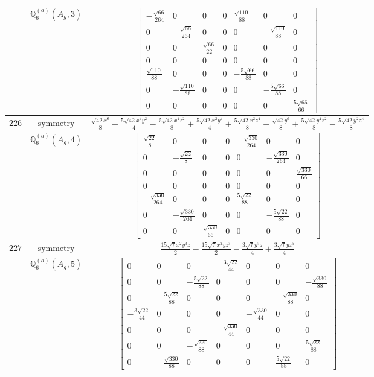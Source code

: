 \documentclass[fleqn,8pt,landscape]{jsarticle}
\begin{document}
\begin{longtable}{ccc}
$  $ & $ \mathbb{Q}_{6}^{(a)}(A_{g},3) $ & $ \begin{bmatrix} - \frac{\sqrt{66}}{264} & 0 & 0 & 0 & \frac{\sqrt{110}}{88} & 0 & 0 \\ 0 & - \frac{\sqrt{66}}{264} & 0 & 0 & 0 & - \frac{\sqrt{110}}{88} & 0 \\ 0 & 0 & \frac{\sqrt{66}}{22} & 0 & 0 & 0 & 0 \\ 0 & 0 & 0 & 0 & 0 & 0 & 0 \\ \frac{\sqrt{110}}{88} & 0 & 0 & 0 & - \frac{5 \sqrt{66}}{88} & 0 & 0 \\ 0 & - \frac{\sqrt{110}}{88} & 0 & 0 & 0 & - \frac{5 \sqrt{66}}{88} & 0 \\ 0 & 0 & 0 & 0 & 0 & 0 & \frac{5 \sqrt{66}}{66} \end{bmatrix} $ \\ \hline
$ 226 $ & $ \text{symmetry} $ & $ \frac{\sqrt{42} x^{6}}{8} - \frac{5 \sqrt{42} x^{4} y^{2}}{4} - \frac{5 \sqrt{42} x^{4} z^{2}}{8} + \frac{5 \sqrt{42} x^{2} y^{4}}{4} + \frac{5 \sqrt{42} x^{2} z^{4}}{8} - \frac{\sqrt{42} y^{6}}{8} + \frac{5 \sqrt{42} y^{4} z^{2}}{8} - \frac{5 \sqrt{42} y^{2} z^{4}}{8} $ \\
$  $ & $ \mathbb{Q}_{6}^{(a)}(A_{g},4) $ & $ \begin{bmatrix} \frac{\sqrt{22}}{8} & 0 & 0 & 0 & - \frac{\sqrt{330}}{264} & 0 & 0 \\ 0 & - \frac{\sqrt{22}}{8} & 0 & 0 & 0 & - \frac{\sqrt{330}}{264} & 0 \\ 0 & 0 & 0 & 0 & 0 & 0 & \frac{\sqrt{330}}{66} \\ 0 & 0 & 0 & 0 & 0 & 0 & 0 \\ - \frac{\sqrt{330}}{264} & 0 & 0 & 0 & \frac{5 \sqrt{22}}{88} & 0 & 0 \\ 0 & - \frac{\sqrt{330}}{264} & 0 & 0 & 0 & - \frac{5 \sqrt{22}}{88} & 0 \\ 0 & 0 & \frac{\sqrt{330}}{66} & 0 & 0 & 0 & 0 \end{bmatrix} $ \\ \hline
$ 227 $ & $ \text{symmetry} $ & $ \frac{15 \sqrt{7} x^{2} y^{3} z}{2} - \frac{15 \sqrt{7} x^{2} y z^{3}}{2} - \frac{3 \sqrt{7} y^{5} z}{4} + \frac{3 \sqrt{7} y z^{5}}{4} $ \\
$  $ & $ \mathbb{Q}_{6}^{(a)}(A_{g},5) $ & $ \begin{bmatrix} 0 & 0 & 0 & - \frac{3 \sqrt{22}}{44} & 0 & 0 & 0 \\ 0 & 0 & - \frac{5 \sqrt{22}}{88} & 0 & 0 & 0 & - \frac{\sqrt{330}}{88} \\ 0 & - \frac{5 \sqrt{22}}{88} & 0 & 0 & 0 & - \frac{\sqrt{330}}{88} & 0 \\ - \frac{3 \sqrt{22}}{44} & 0 & 0 & 0 & - \frac{\sqrt{330}}{44} & 0 & 0 \\ 0 & 0 & 0 & - \frac{\sqrt{330}}{44} & 0 & 0 & 0 \\ 0 & 0 & - \frac{\sqrt{330}}{88} & 0 & 0 & 0 & \frac{5 \sqrt{22}}{88} \\ 0 & - \frac{\sqrt{330}}{88} & 0 & 0 & 0 & \frac{5 \sqrt{22}}{88} & 0 \end{bmatrix} $ \\ \hline

\end{longtable}
\end{document}
